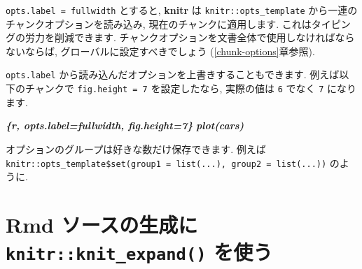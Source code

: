 \documentclass[
  11pt,
  lualatex,
  ja=standard]{bxjsreport}
\newenvironment{Shaded}{\begin{snugshade}}{\end{snugshade}}
\newcommand{\InformationTok}[1]{\textcolor[rgb]{0.56,0.35,0.01}{\textbf{\textit{#1}}}}
\begin{document}
\begin{Shaded}
\end{Shaded}

\texttt{opts.label = \textquotesingle{}fullwidth\textquotesingle{}} とすると, \textbf{knitr} は \texttt{knitr::opts\_template} から一連のチャンクオプションを読み込み, 現在のチャンクに適用します. これはタイピングの労力を削減できます. チャンクオプションを文書全体で使用しなければならないならば, グローバルに設定すべきでしょう (\ref{chunk-options}章参照).

\texttt{opts.label} から読み込んだオプションを上書きすることもできます. 例えば以下のチャンクで \texttt{fig.height = 7} を設定したなら, 実際の値は \texttt{6} でなく \texttt{7} になります.

\begin{Shaded}
\begin{Highlighting}[]
\InformationTok{\textasciigrave{}\textasciigrave{}\textasciigrave{}\{r, opts.label=\textquotesingle{}fullwidth\textquotesingle{}, fig.height=7\}}
\InformationTok{plot(cars)}
\InformationTok{\textasciigrave{}\textasciigrave{}\textasciigrave{}}
\end{Highlighting}
\end{Shaded}

オプションのグループは好きな数だけ保存できます. 例えば \texttt{knitr::opts\_template\$set(group1 = list(...), group2 = list(...))} のように.

\hypertarget{knit-expand}{%
\section{\texorpdfstring{Rmd ソースの生成に \texttt{knitr::knit\_expand()} を使う}{Rmd ソースの生成に knitr::knit\_expand() を使う}}\label{knit-expand}}
\end{document}
